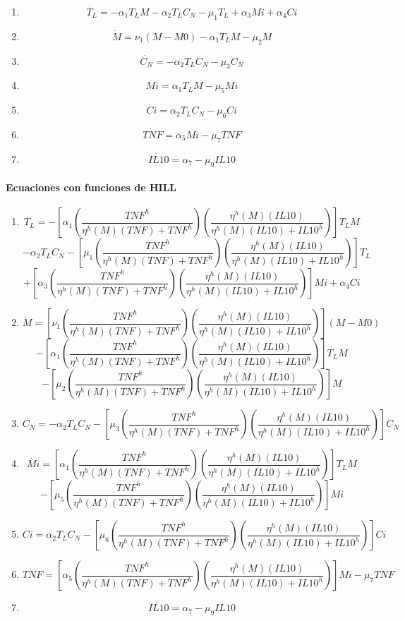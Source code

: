 \documentclass[
]{article}
\providecommand{\tightlist}{%
  \setlength{\itemsep}{0pt}\setlength{\parskip}{0pt}}
\begin{document}
\begin{enumerate}
\def\labelenumi{\arabic{enumi}.}
\tightlist
\item
  \[\dot{T_{L}}= -\alpha_{1}T_{L}M-\alpha_{2}T_{L}C_{N}-\mu_{1}T_{L}+\alpha_{3}Mi+\alpha_{4}Ci \]
\item
  \[\dot{M}=\nu_{1}(M-M0)-\alpha_{1}T_{L}M-\mu_{2}M \]
\item
  \[\dot{C_{N}}=-\alpha_{2}T_{L}C_{N}-\mu_{3}C_{N} \]
\item
  \[\dot{Mi}=\alpha_{1}T_{L}M-\mu_{5}Mi \]
\item
  \[\dot{Ci}=\alpha_{2}T_{L}C_{N}-\mu_{6}Ci \]
\item
  \[\dot{TNF}=\alpha_{5}Mi-\mu_{7}TNF \]
\item
  \[\dot{IL10}=\alpha_{7}-\mu_{9}IL10 \]
\end{enumerate}

\hypertarget{ecuaciones-con-funciones-de-hill}{%
\paragraph{Ecuaciones con funciones de
HILL}\label{ecuaciones-con-funciones-de-hill}}

\begin{enumerate}
\def\labelenumi{\arabic{enumi}.}
\tightlist
\item
  \[\dot{T_{L}}= -[\alpha_{1}(\dfrac{TNF^{h}}{\eta^{h}(M)(TNF)+TNF^{h}})(\dfrac{\eta^{h}(M)(IL10)}{\eta^{h}(M)(IL10)+IL10^{h}})]T_{L}M\]
  \[-\alpha_{2}T_{L}C_{N}-[\mu_{1}(\dfrac{TNF^{h}}{\eta^{h}(M)(TNF)+TNF^{h}})(\dfrac{\eta^{h}(M)(IL10)}{\eta^{h}(M)(IL10)+IL10^{h}})]T_{L}\]
  \[+[\alpha_{3}(\dfrac{TNF^{h}}{\eta^{h}(M)(TNF)+TNF^{h}})(\dfrac{\eta^{h}(M)(IL10)}{\eta^{h}(M)(IL10)+IL10^{h}})]Mi+\alpha_{4}Ci \]
\item
  \[\dot{M}=[\nu_{1}(\dfrac{TNF^{h}}{\eta^{h}(M)(TNF)+TNF^{h}})(\dfrac{\eta^{h}(M)(IL10)}{\eta^{h}(M)(IL10)+IL10^{h}})](M-M0)\]
  \[-[\alpha_{1}(\dfrac{TNF^{h}}{\eta^{h}(M)(TNF)+TNF^{h}})(\dfrac{\eta^{h}(M)(IL10)}{\eta^{h}(M)(IL10)+IL10^{h}})]T_{L}M\]
  \[-[\mu_{2}(\dfrac{TNF^{h}}{\eta^{h}(M)(TNF)+TNF^{h}})(\dfrac{\eta^{h}(M)(IL10)}{\eta^{h}(M)(IL10)+IL10^{h}})]M \]
\item
  \[\dot{C_{N}}=-\alpha_{2}T_{L}C_{N}-[\mu_{3}(\dfrac{TNF^{h}}{\eta^{h}(M)(TNF)+TNF^{h}})(\dfrac{\eta^{h}(M)(IL10)}{\eta^{h}(M)(IL10)+IL10^{h}})]C_{N} \]
\item
  \[\dot{Mi}=[\alpha_{1}(\dfrac{TNF^{h}}{\eta^{h}(M)(TNF)+TNF^{h}})(\dfrac{\eta^{h}(M)(IL10)}{\eta^{h}(M)(IL10)+IL10^{h}})]T_{L}M\]
  \[-[\mu_{5}(\dfrac{TNF^{h}}{\eta^{h}(M)(TNF)+TNF^{h}})(\dfrac{\eta^{h}(M)(IL10)}{\eta^{h}(M)(IL10)+IL10^{h}})]Mi \]
\item
  \[\dot{Ci}=\alpha_{2}T_{L}C_{N}-[\mu_{6}(\dfrac{TNF^{h}}{\eta^{h}(M)(TNF)+TNF^{h}})(\dfrac{\eta^{h}(M)(IL10)}{\eta^{h}(M)(IL10)+IL10^{h}})]Ci \]
\item
  \[\dot{TNF}=[\alpha_{5}(\dfrac{TNF^{h}}{\eta^{h}(M)(TNF)+TNF^{h}})(\dfrac{\eta^{h}(M)(IL10)}{\eta^{h}(M)(IL10)+IL10^{h}})]Mi-\mu_{7}TNF \]
\item
  \[\dot{IL10}=\alpha_{7}-\mu_{9}IL10 \]
\end{enumerate}
\end{document}

